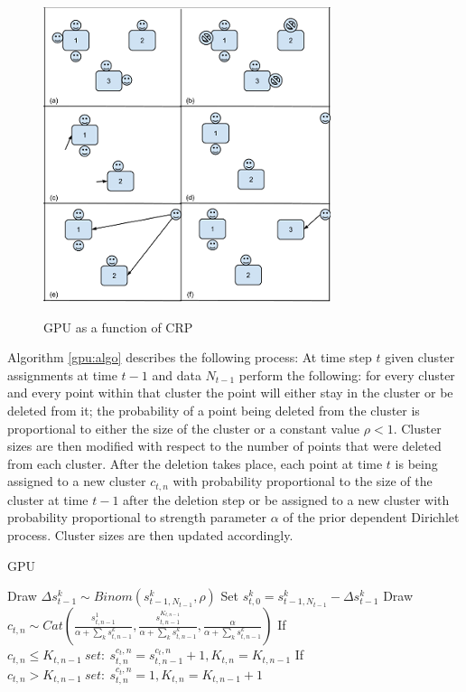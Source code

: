 \documentclass [twoside,hidelinks]{article}
\begin{document}
\begin{figure}
    \includegraphics [width=.53\textwidth]{generalPolya2}
    \label{generalPolya}
    \caption{GPU as a function of CRP}
\end{figure}


Algorithm \ref{gpu:algo} describes the following process: At time step $t$ given cluster assignments at time $t-1$ and data $N_{t-1}$ perform the following: for every cluster and every point within that cluster the point will either stay in the cluster or be deleted from it; the probability of a point being deleted from the cluster is proportional to either the size of the cluster or a constant value $\rho <1$\cite{caron}. Cluster sizes are then modified with respect to the number of points that were deleted from each cluster. After the deletion takes place, each point at time $t$ is being assigned to a new cluster $c_{t,n}$  with probability proportional to the size of the cluster at time $t-1$ after the deletion step or be assigned to a new cluster with probability proportional to strength parameter $\alpha$ of the prior dependent Dirichlet process. Cluster sizes are then updated accordingly.

\begin{algorithm}
  \caption{GPU}\label{GPU}
  \begin{algorithmic} [1]

	      \State Draw $\Delta s_{t-1}^k \sim Binom (s_{t-1,N_{t-1}}^k, \rho) $ 
	      \State Set $s_{t,0}^{k} = s_{t-1,N_{t-1}}^{k} -\Delta s_{t-1}^k$
      \EndFor
      	    \State Draw $c_{t,n} \sim Cat ( \frac{ s_{t,n-1}^{1} }{\alpha + \sum_k s_{t,n-1}^{k} }, \frac{ s_{t,n-1}^{K_{t,n-1}} }{\alpha + \sum_k s_{t,n-1}^{k} } , \frac{ \alpha}{\alpha + \sum_k s_{t,n-1}^{k} }) $
      	    \State If $c_{t,n} \leq K_{t,n-1}\ set:\ s_{t,n}^{c_t,n} = s_{t,n-1}^{c_t,n} + 1 , K_{t,n} = K_{t,n-1}$
      	    \State If $c_{t,n} > K_{t,n-1}\ set:\ s_{t,n}^{c_t,n} = 1 , K_{t,n} = K_{t,n-1} + 1$
      \EndFor
    \EndProcedure
  \end{algorithmic}
  \label{gpu:algo}
\end{algorithm}
\end{document}
